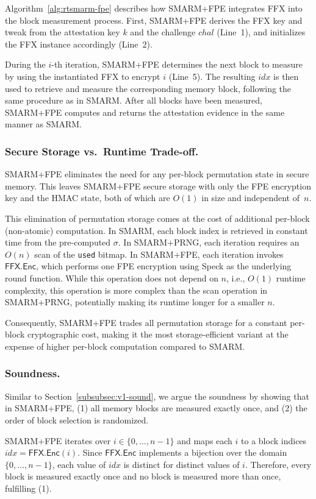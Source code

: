 \documentclass{ieeeaccess}
\newcommand{\rtsmarmone}{SMARM+PRNG\xspace}
\newcommand{\rtsmarmtwo}{SMARM+FPE\xspace}
\begin{document}
Algorithm~\ref{alg:rtsmarm-fpe} describes how \rtsmarmtwo integrates FFX into the block measurement process.
First, \rtsmarmtwo derives the FFX key and tweak from the attestation key $k$ and the challenge $chal$ (Line~1), and initializes the FFX instance accordingly (Line~2).

During the $i$-th iteration, \rtsmarmtwo determines the next block to measure by using the instantiated FFX to encrypt $i$ (Line~5).
The resulting $idx$ is then used to retrieve and measure the corresponding memory block, following the same procedure as in SMARM.
After all blocks have been measured, \rtsmarmtwo computes and returns the attestation evidence in the same manner as SMARM.

\subsubsection{Secure Storage vs.\ Runtime Trade-off.}
\rtsmarmtwo eliminates the need for any per-block permutation state in secure memory.
This leaves \rtsmarmtwo secure storage with only the FPE encryption key and the HMAC state, both of which are $O(1)$ in size and independent of~$n$.

This elimination of permutation storage comes at the cost 
of additional per-block (non-atomic) computation.
In SMARM, each block index is retrieved in constant time 
from the pre-computed $\sigma$.
In \rtsmarmone, each iteration requires an $O(n)$ scan of 
the \texttt{used} bitmap.
In \rtsmarmtwo, each iteration invokes 
$\mathsf{FFX.Enc}$, which performs one FPE encryption using Speck as the underlying round function. 
While this operation does not depend on $n$, i.e., $O(1)$ runtime complexity, this operation is more complex than the scan operation in \rtsmarmone, potentially making its runtime longer for a smaller $n$.

Consequently, \rtsmarmtwo trades all permutation storage 
for a constant per-block cryptographic cost, making it 
the most storage-efficient variant at the expense of higher per-block computation compared to SMARM.

\subsubsection{Soundness.}
Similar to Section~\ref{subsubsec:v1-sound}, we argue the soundness by showing that in \rtsmarmtwo, (1) all memory blocks are measured exactly once, and (2) the order of block selection is randomized.

\rtsmarmtwo iterates over $i \in \{0, \ldots, n-1\}$ 
and maps each $i$ to a block indices 
$idx = \mathsf{FFX.Enc}(i)$.
Since $\mathsf{FFX.Enc}$ implements a bijection over the domain 
$\{0, \ldots, n-1\}$, each value of $idx$ is distinct for 
distinct values of $i$.
Therefore, every block is measured exactly once and no block 
is measured more than once, fulfilling (1).
\end{document}

